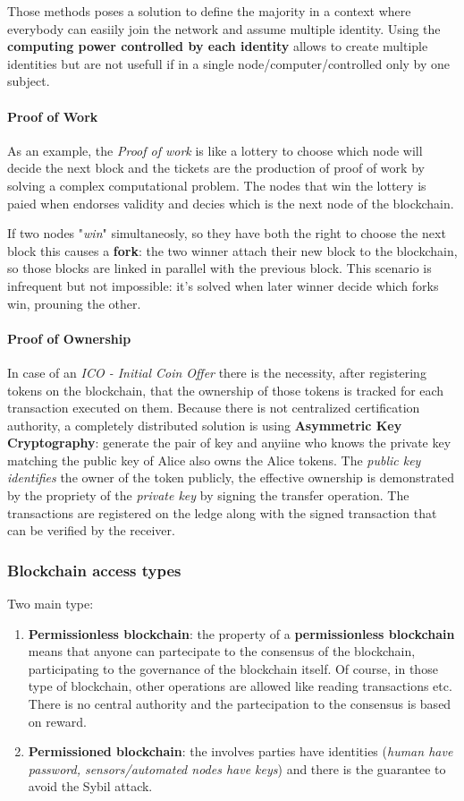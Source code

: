 \documentclass[10pt,a4paper]{report}
\begin{document}
Those methods poses a solution to define the majority in a context where everybody can easiily join the network and assume multiple identity. Using the \textbf{computing power controlled by each identity} allows to create multiple identities but are not usefull if in a single node/computer/controlled only by one subject.
\paragraph{Proof of Work}\label{sec:proof-of-work}
As an example, the \textit{Proof of work} is like a lottery to choose which node will decide the next block and the tickets are the production of proof of work by solving a complex computational problem. The nodes that win the lottery is paied when endorses validity and decies which is the next node of the blockchain.

If two nodes "\textit{win}" simultaneosly, so they have both the right to choose the next block this causes a \textbf{fork}: the two winner attach their new block to the blockchain, so those blocks are linked in parallel with the previous block. This scenario is infrequent but not impossible: it's solved when later winner decide which forks win, prouning the other.
\paragraph{Proof of Ownership}\label{sec:proof-of-ownership}
In case of an \textit{ICO - Initial Coin Offer} there is the necessity, after registering tokens on the blockchain, that the ownership of those tokens is tracked for each transaction executed on them. Because there is not centralized certification authority, a completely distributed solution is using \textbf{Asymmetric Key Cryptography}: generate the pair of key and anyiine who knows the private key matching the public key of Alice also owns the Alice tokens.
The \textit{public key identifies} the owner of the token publicly, the effective ownership is demonstrated by the propriety of the \textit{private key} by signing the transfer operation.
The transactions are registered on the ledge along with the signed transaction that can be verified by the receiver.
\subsubsection{Blockchain access types}\label{sec:blockchain-access-types}
Two main type:
\begin{enumerate}
	\item 
	\textbf{Permissionless blockchain}: the property of a \textbf{permissionless blockchain} means that anyone can partecipate to the consensus of the blockchain, participating to the governance of the blockchain itself. Of course, in those type of blockchain, other operations are allowed like reading transactions etc. There is no central authority and the partecipation to the consensus is based on reward.
	\item 
	\textbf{Permissioned blockchain}: the involves parties have identities (\textit{human have password, sensors/automated nodes have keys}) and there is the guarantee to avoid the Sybil attack.
\end{enumerate}
\end{document}
